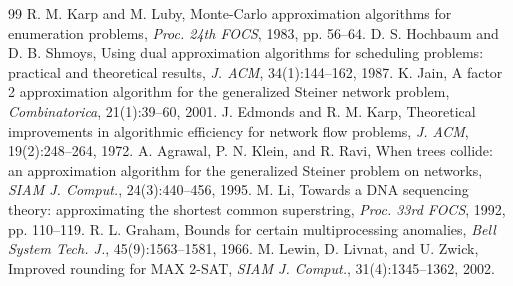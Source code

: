 \documentclass[11pt,oneside]{book}
\begin{document}
\begin{thebibliography}{99}
 R. M. Karp and M. Luby, Monte-Carlo approximation algorithms for enumeration problems, \textit{Proc. 24th FOCS}, 1983, pp. 56--64.
 D. S. Hochbaum and D. B. Shmoys, Using dual approximation algorithms for scheduling problems: practical and theoretical results, \textit{J. ACM}, 34(1):144--162, 1987.
 K. Jain, A factor 2 approximation algorithm for the generalized Steiner network problem, \textit{Combinatorica}, 21(1):39--60, 2001.
 J. Edmonds and R. M. Karp, Theoretical improvements in algorithmic efficiency for network flow problems, \textit{J. ACM}, 19(2):248--264, 1972.
 A. Agrawal, P. N. Klein, and R. Ravi, When trees collide: an approximation algorithm for the generalized Steiner problem on networks, \textit{SIAM J. Comput.}, 24(3):440--456, 1995.
 M. Li, Towards a DNA sequencing theory: approximating the shortest common superstring, \textit{Proc. 33rd FOCS}, 1992, pp. 110--119.
 R. L. Graham, Bounds for certain multiprocessing anomalies, \textit{Bell System Tech. J.}, 45(9):1563--1581, 1966.
 M. Lewin, D. Livnat, and U. Zwick, Improved rounding for MAX 2-SAT, \textit{SIAM J. Comput.}, 31(4):1345--1362, 2002.
\end{thebibliography}

\end{document}
